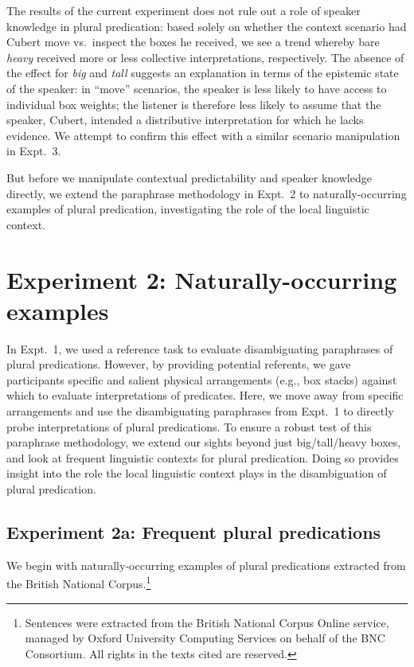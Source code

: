 \documentclass[linguex]{sp}
\begin{document}
The results of the current experiment does not rule out a role of speaker knowledge in plural predication: based solely on whether the context scenario had Cubert move vs.~inspect the boxes he received, we see a trend whereby bare \emph{heavy} received more or less collective interpretations, respectively. The absence of the effect for \emph{big} and \emph{tall} suggests an explanation in terms of the epistemic state of the speaker: in ``move'' scenarios, the speaker is less likely to have access to individual box weights; the listener is therefore less likely to assume that the speaker, Cubert, intended a distributive interpretation for which he lacks evidence. We attempt to confirm this effect with a similar scenario manipulation in Expt.~3.

But before we manipulate contextual predictability and speaker knowledge directly, we extend the paraphrase methodology in Expt.~2 to naturally-occurring examples of plural predication, investigating the role of the local linguistic context.


\section{Experiment 2: Naturally-occurring examples}

In Expt.~1, we used a reference task to evaluate disambiguating paraphrases of plural predications. However, by providing potential referents, we gave participants specific and salient physical arrangements (e.g., box stacks) against which to evaluate interpretations of predicates. Here, we move away from specific arrangements and use the disambiguating paraphrases from Expt.~1 to directly probe interpretations of plural predications.
To ensure a robust test of this paraphrase methodology, we extend our sights beyond just big/tall/heavy boxes, and look at frequent linguistic contexts for plural predication. Doing so provides insight into the role the local linguistic context plays in the disambiguation of plural predication.

\subsection{Experiment 2a: Frequent plural predications}

 We begin with naturally-occurring examples of plural predications extracted from the British National Corpus.\footnote{Sentences were extracted from the British National Corpus Online service, managed by Oxford University Computing Services on behalf of the BNC Consortium. All rights in the texts cited are reserved.}
\end{document}
